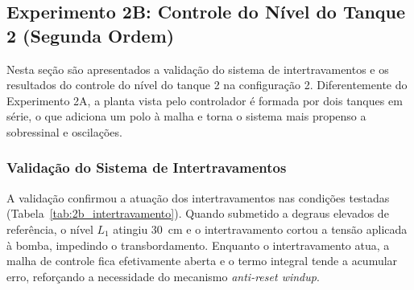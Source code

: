 \documentclass[a4paper,12pt]{article}
\begin{document}
\newpage

\subsection{Experimento 2B: Controle do Nível do Tanque 2 (Segunda Ordem)}

\begin{justify}
    \hspace{4ex}Nesta seção são apresentados a validação do sistema de intertravamentos e os resultados do controle do nível do tanque 2 na configuração 2. Diferentemente do Experimento 2A, a planta vista pelo controlador é formada por dois tanques em série, o que adiciona um polo à malha e torna o sistema mais propenso a sobressinal e oscilações.
\end{justify}

\subsubsection{Validação do Sistema de Intertravamentos}

\begin{justify}
    \hspace{4ex}A validação confirmou a atuação dos intertravamentos nas condições testadas (Tabela~\ref{tab:2b_intertravamento}). Quando submetido a degraus elevados de referência, o nível $L_1$ atingiu $30$~cm e o intertravamento cortou a tensão aplicada à bomba, impedindo o transbordamento. Enquanto o intertravamento atua, a malha de controle fica efetivamente aberta e o termo integral tende a acumular erro, reforçando a necessidade do mecanismo \textit{anti-reset windup}.
\end{justify}

\begin{table}[H]
\centering
\caption{Validação experimental do sistema de intertravamentos de segurança.}
\label{tab:2b_intertravamento}
\end{table}
\end{document}
